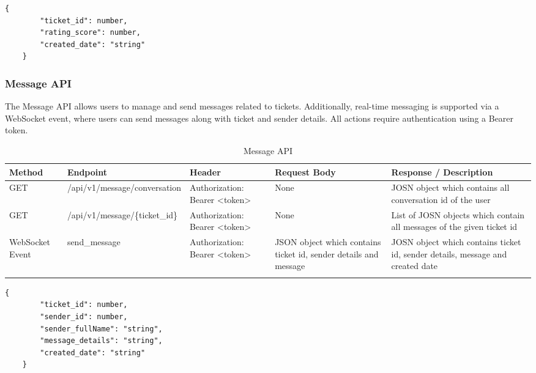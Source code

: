 \newpage
\begin{lstlisting}[breaklines=true, caption=Rating Schema]
	{
		"ticket_id": number,
		"rating_score": number,
		"created_date": "string"
	}
\end{lstlisting}




\subsubsection{Message API}
The Message API allows users to manage and send messages related to tickets. Additionally, real-time messaging is supported via a WebSocket event, where users can send messages along with ticket and sender details. All actions require authentication using a Bearer token.

\begin{longtable}{|m{1.9cm}|m{5.5cm}|m{3cm}|m{2.5cm}|m{3cm}|}
	\hline
	\textbf{Method} & \textbf{Endpoint} & \textbf{Header}                                                                                                                            & \textbf{Request Body} & \textbf{Response / Description}   \\ \hline
	\endhead
	
	GET & /api/v1/message/conversation & Authorization: Bearer <token>  & None & JOSN object which contains all conversation id of the user\\ \hline
	
	GET & /api/v1/message/\{ticket\_id\} & Authorization: Bearer <token>  & None & List of JOSN objects which contain all messages of the given ticket id\\ \hline
	
	WebSocket \newline Event & send\_message &  Authorization: Bearer <token> & JSON object which contains ticket id, sender details and message & JOSN object which contains ticket id, sender details, message and created date\\ \hline
	
	\caption{Message API}
	\label{tab:message-api}
	
\end{longtable}

\begin{lstlisting}[breaklines=true, caption=Message Schema]
	{
		"ticket_id": number,
		"sender_id": number,
		"sender_fullName": "string",
		"message_details": "string",
		"created_date": "string"
	}
\end{lstlisting}



